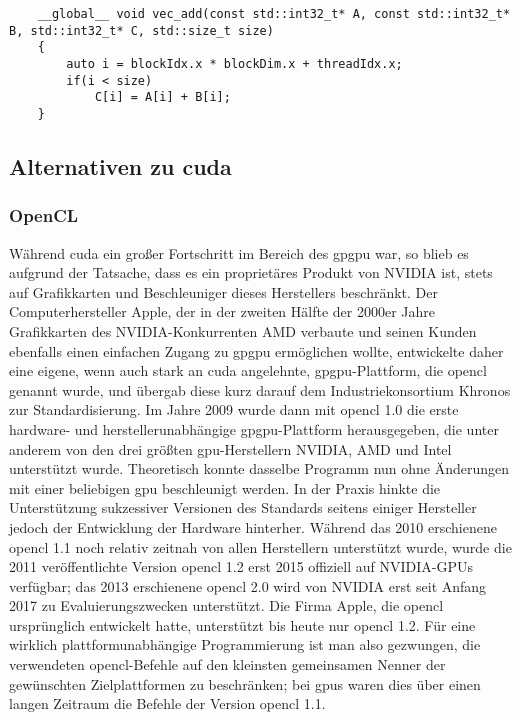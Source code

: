 \begin{verbatim}
    __global__ void vec_add(const std::int32_t* A, const std::int32_t* B, std::int32_t* C, std::size_t size)
    {
        auto i = blockIdx.x * blockDim.x + threadIdx.x;
        if(i < size)
            C[i] = A[i] + B[i];
    }
\end{verbatim}

\subsection{Alternativen zu \gls{cuda}}

\subsubsection{OpenCL{\texttrademark}}

Während \gls{cuda} ein großer Fortschritt im Bereich des \gls{gpgpu} war, so blieb es aufgrund der Tatsache, dass es
ein proprietäres Produkt von NVIDIA{\textregistered} ist, stets auf Grafikkarten und Beschleuniger dieses Herstellers
beschränkt. Der Computerhersteller Apple{\textregistered}, der in der zweiten Hälfte der 2000er Jahre Grafikkarten des
NVIDIA{\textregistered}-Konkurrenten AMD verbaute und seinen Kunden ebenfalls einen einfachen Zugang zu
\gls{gpgpu} ermöglichen wollte, entwickelte daher eine eigene, wenn auch stark an \gls{cuda} angelehnte,
\gls{gpgpu}-Plattform, die \gls{opencl} genannt wurde, und übergab diese kurz darauf dem Industriekonsortium Khronos zur
Standardisierung. Im Jahre 2009 wurde dann mit \gls{opencl} 1.0 die erste hardware- und herstellerunabhängige
\gls{gpgpu}-Plattform herausgegeben, die unter anderem von den drei größten \gls{gpu}-Herstellern
NVIDIA{\textregistered}, AMD und Intel{\textregistered} unterstützt wurde. Theoretisch konnte dasselbe Programm nun ohne
Änderungen mit einer beliebigen \gls{gpu} beschleunigt werden. In der Praxis hinkte die Unterstützung sukzessiver
Versionen des Standards seitens einiger Hersteller jedoch der Entwicklung der Hardware hinterher. Während das 2010
erschienene \gls{opencl} 1.1 noch relativ zeitnah von allen Herstellern unterstützt wurde, wurde die 2011
veröffentlichte Version \gls{opencl} 1.2 erst 2015 offiziell auf NVIDIA{\textregistered}-GPUs verfügbar; das 2013
erschienene \gls{opencl} 2.0 wird von NVIDIA{\textregistered} erst seit Anfang 2017 zu Evaluierungszwecken unterstützt.
Die Firma Apple{\textregistered}, die \gls{opencl} ursprünglich entwickelt hatte, unterstützt bis heute nur \gls{opencl}
1.2. Für eine wirklich plattformunabhängige Programmierung ist man also gezwungen, die verwendeten \gls{opencl}-Befehle
auf den kleinsten gemeinsamen Nenner der gewünschten Zielplattformen zu beschränken; bei \gls{gpu}s waren dies über
einen langen Zeitraum die Befehle der Version \gls{opencl} 1.1.

